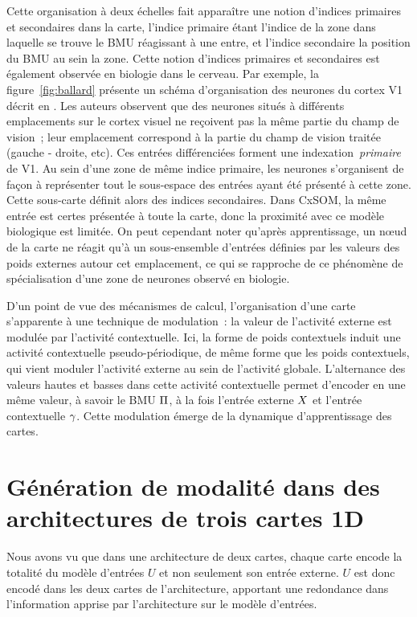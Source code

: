 \documentclass[../main]{subfiles}
\begin{document}
Cette organisation à deux échelles fait apparaître une notion d'indices primaires et secondaires dans la carte, l'indice primaire étant l'indice de la zone dans laquelle se trouve le BMU réagissant à une entre, et l'indice secondaire la position du BMU au sein la zone.
Cette notion d'indices primaires et secondaires est également observée en biologie dans le cerveau. 
Par exemple, la figure~\ref{fig:ballard} présente un schéma d'organisation des neurones du cortex V1 décrit en \cite{ballard_cortical_1986}.
Les auteurs observent que des neurones situés à différents emplacements sur le cortex visuel ne reçoivent pas la même partie du champ de vision~; leur emplacement correspond à la partie du champ de vision traitée (gauche - droite, etc). Ces entrées différenciées forment une indexation~\emph{primaire} de V1. 
Au sein d'une zone de même indice primaire, les neurones s'organisent de façon à représenter tout le sous-espace des entrées ayant été présenté à cette zone. Cette sous-carte définit alors des indices secondaires.
Dans CxSOM, la même entrée est certes présentée à toute la carte, donc la proximité avec ce modèle biologique est limitée. On peut cependant noter qu'après apprentissage, un n\oe{}ud de la carte ne réagit qu'à un sous-ensemble d'entrées définies par les valeurs des poids externes autour cet emplacement, ce qui se rapproche de ce phénomène de spécialisation d'une zone de neurones observé en biologie.


D'un point de vue des mécanismes de calcul, l'organisation d'une carte s'apparente à une technique de modulation~: la valeur de l'activité externe est modulée par l'activité contextuelle. 
Ici, la forme de poids contextuels induit une activité contextuelle pseudo-périodique, de même forme que les poids contextuels, qui vient moduler l'activité externe au sein de l'activité globale. 
L'alternance des valeurs hautes et basses dans cette activité contextuelle permet d'encoder en une même valeur, à savoir le BMU $\Pi$, à la fois l'entrée externe $X$ et l'entrée contextuelle $\gamma$. Cette modulation émerge de la dynamique d'apprentissage des cartes.

\section{Génération de modalité dans des architectures de trois cartes 1D}\label{sec:pred}


Nous avons vu que dans une architecture de deux cartes, chaque carte encode la totalité du modèle d'entrées $U$ et non seulement son entrée externe. $U$ est donc encodé dans les deux cartes de l'architecture, apportant une redondance dans l'information apprise par l'architecture sur le modèle d'entrées.
\end{document}

